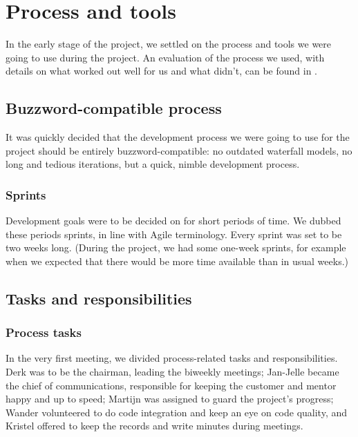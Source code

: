 \chapter{Process and tools}

In the early stage of the project, we settled on the process and tools we were going to use during the project. An evaluation of the process we used, with details on what worked out well for us and what didn't, can be found in . 

\section{Buzzword-compatible process}

It was quickly decided that the development process we were going to use for the project should be entirely buzzword-compatible: no outdated waterfall models, no long and tedious iterations, but a quick, nimble development process. 

\subsection{Sprints}

Development goals were to be decided on for short periods of time. We dubbed these periods sprints, in line with Agile terminology. Every sprint was set to be two weeks long. (During the project, we had some one-week sprints, for example when we expected that there would be more time available than in usual weeks.) 

\section{Tasks and responsibilities}

\subsection{Process tasks}

In the very first meeting, we divided process-related tasks and responsibilities. Derk was to be the chairman, leading the biweekly meetings; Jan-Jelle became the chief of communications, responsible for keeping the customer and mentor happy and up to speed; Martijn was assigned to guard the project's progress; Wander volunteered to do code integration and keep an eye on code quality, and Kristel offered to keep the records and write minutes during meetings. 

